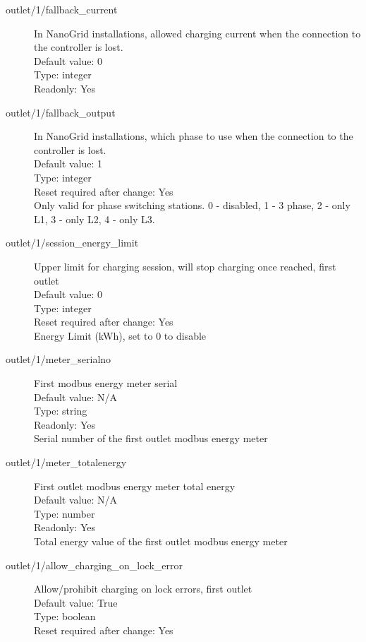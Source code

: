 \begin{description}
\item[outlet/1/fallback\_current] In NanoGrid installations, allowed charging current when the connection to the controller is lost.\\
  Default value: 0\\
  Type: integer\\
  Readonly: Yes\\

\item[outlet/1/fallback\_output] In NanoGrid installations, which phase to use when the connection to the controller is lost.\\
  Default value: 1\\
  Type: integer\\
  Reset required after change: Yes\\
  Only valid for phase switching stations. 0 - disabled, 1 - 3 phase, 2 - only L1, 3 - only L2, 4 - only L3.\\

\item[outlet/1/session\_energy\_limit] Upper limit for charging session, will stop charging once reached, first outlet\\
  Default value: 0\\
  Type: integer\\
  Reset required after change: Yes\\
  Energy Limit (kWh), set to 0 to disable\\

\item[outlet/1/meter\_serialno] First modbus energy meter serial\\
  Default value: N/A\\
  Type: string\\
  Readonly: Yes\\
  Serial number of the first outlet modbus energy meter\\

\item[outlet/1/meter\_totalenergy] First outlet modbus energy meter total energy\\
  Default value: N/A\\
  Type: number\\
  Readonly: Yes\\
  Total energy value of the first outlet modbus energy meter\\

\item[outlet/1/allow\_charging\_on\_lock\_error] Allow/prohibit charging on lock errors, first outlet\\
  Default value: True\\
  Type: boolean\\
  Reset required after change: Yes\\


\end{description}
